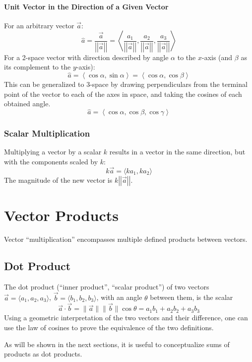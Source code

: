 \documentclass{article}
\newcommand{\vect}[1]{\ensuremath{\overrightarrow{#1}}}
\newcommand{\magnitude}[1]{\ensuremath{\lVert #1 \rVert}}
\newcommand{\magvect}[1]{\magnitude{\vect{#1}}}
\begin{document}
\paragraph{Unit Vector in the Direction of a Given Vector}
For an arbitrary vector $\overrightarrow{a}$:
$$\hat{a} = \frac{\overrightarrow{a}}{\left|\left|\overrightarrow{a}\right|\right|} = \left\langle \frac{a_1}{\left|\left|\overrightarrow{a}\right|\right|}, \frac{a_2}{\left|\left|\overrightarrow{a}\right|\right|}, \frac{a_3}{\left|\left|\overrightarrow{a}\right|\right|} \right\rangle$$
For a 2-space vector with direction described by angle $\alpha$ to the $x$-axis (and $\beta$ as its complement to the $y$-axis):
$$\hat{a} = \left\langle \cos{\alpha}, \sin{\alpha} \right\rangle = \left\langle \cos{\alpha}, \cos{\beta} \right\rangle$$
This can be generalized to 3-space by drawing perpendiculars from the terminal point of the vector to each of the axes in space, and taking the cosines of each obtained angle.
$$\hat{a} = \left\langle \cos{\alpha}, \cos{\beta}, \cos{\gamma} \right\rangle$$

\subsubsection{Scalar Multiplication}
Multiplying a vector by a scalar $k$ results in a vector in the same direction, but with the components scaled by $k$:
$$k\overrightarrow{a} = \langle ka_1, ka_2 \rangle$$
The magnitude of the new vector is $k\left|\left|\overrightarrow{a}\right|\right|$.

\section{Vector Products}
Vector ``multiplication'' encompasses multiple defined products between vectors.

\subsection{Dot Product}
The dot product (``inner product'', ``scalar product'') of two vectors $\vect{a} = \langle a_1, a_2, a_3 \rangle$, $\vect{b} = \langle b_1, b_2, b_3 \rangle$, with an angle $\theta$ between them, is the scalar
$$\vect{a} \cdot \vect{b} = \magvect{a}\magvect{b}\cos{\theta} = a_1b_1 + a_2b_2 + a_3b_3$$
Using a geometric interpretation of the two vectors and their difference, one can use the law of cosines to prove the equivalence of the two definitions.

As will be shown in the next sections, it is useful to conceptualize sums of products as dot products.
\end{document}
